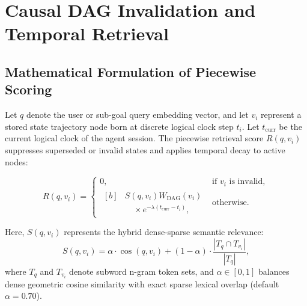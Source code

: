 \documentclass[10pt,journal,compsoc]{IEEEtran}
\begin{document}
\section{Causal DAG Invalidation and Temporal Retrieval}
\label{sec:causal_retrieval}

\subsection{Mathematical Formulation of Piecewise Scoring}
Let $q$ denote the user or sub-goal query embedding vector, and let $v_i$ represent a stored state trajectory node born at discrete logical clock step $t_i$. Let $t_{\text{curr}}$ be the current logical clock of the agent session. The piecewise retrieval score $R(q, v_i)$ suppresses superseded or invalid states and applies temporal decay to active nodes:

\begin{equation}
\label{eq:piecewise_scoring}
R(q, v_i) = 
\begin{cases} 
0, & \text{if } v_i \text{ is invalid}, \\
\begin{aligned}[b]
& S(q, v_i) W_{\text{DAG}}(v_i) \\
& \quad \times e^{-\lambda(t_{\text{curr}} - t_i)},
\end{aligned} & \text{otherwise}.
\end{cases}
\end{equation}

Here, $S(q, v_i)$ represents the hybrid dense-sparse semantic relevance:
\begin{equation}
S(q, v_i) = \alpha \cdot \cos(q, v_i) + (1 - \alpha) \cdot \frac{|T_q \cap T_{v_i}|}{|T_q|},
\end{equation}
where $T_q$ and $T_{v_i}$ denote subword n-gram token sets, and $\alpha \in [0, 1]$ balances dense geometric cosine similarity with exact sparse lexical overlap (default $\alpha = 0.70$).
\end{document}
